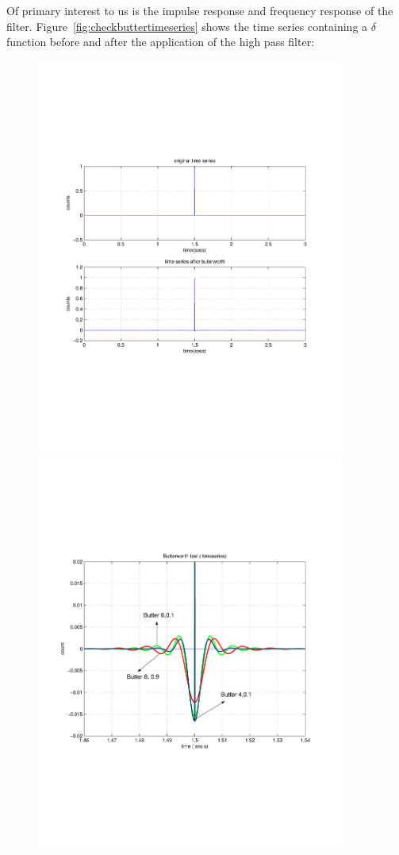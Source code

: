 Of primary interest to us is the impulse response and frequency response 
of the filter. Figure~\ref{fig:checkbuttertimeseries} shows the 
time series containing a $\delta$ function before and after the 
application of the high pass filter:
\begin{figure}[h]
\begin{center}
\includegraphics[width=0.9\textwidth]{figures/checkbuttertimeseries}
\includegraphics[width=0.9\textwidth]{figures/butter894comptimeseries}

\end{center}
\end{figure}
